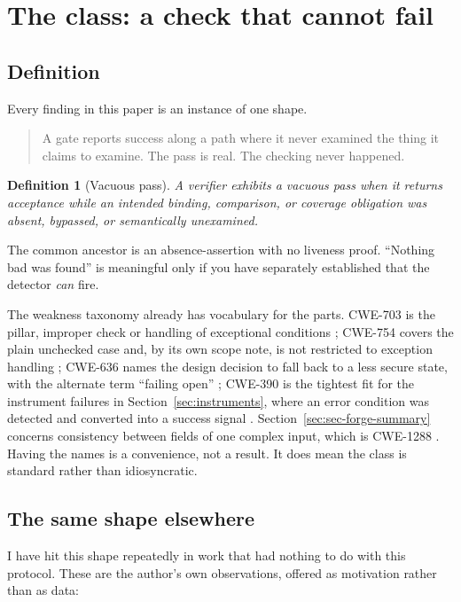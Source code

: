 \documentclass[11pt]{article}
\newtheorem{definition}{Definition}
\begin{document}
\section{The class: a check that cannot fail}
\label{sec:class}

\subsection{Definition}

Every finding in this paper is an instance of one shape.

\begin{quote}
A gate reports success along a path where it never examined the thing it claims to examine.
The pass is real. The checking never happened.
\end{quote}

\begin{definition}[Vacuous pass]
A verifier exhibits a \emph{vacuous pass} when it returns acceptance while an intended
binding, comparison, or coverage obligation was absent, bypassed, or semantically
unexamined.
\end{definition}

The common ancestor is an absence-assertion with no liveness proof. ``Nothing bad was
found'' is meaningful only if you have separately established that the detector \emph{can}
fire.

The weakness taxonomy already has vocabulary for the parts. CWE-703 is the pillar,
improper check or handling of exceptional conditions \citep{cwe703}; CWE-754 covers the
plain unchecked case and, by its own scope note, is not restricted to exception handling
\citep{cwe754}; CWE-636 names the design decision to fall back to a less secure state, with
the alternate term ``failing open'' \citep{cwe636}; CWE-390 is the tightest fit for the
instrument failures in Section~\ref{sec:instruments}, where an error condition was detected
and converted into a success signal \citep{cwe390}. Section~\ref{sec:sec-forge-summary}
concerns consistency between fields of one complex input, which is CWE-1288
\citep{cwe1288}. Having the names is a convenience, not a result. It does mean the class is
standard rather than idiosyncratic.

\subsection{The same shape elsewhere}

I have hit this shape repeatedly in work that had nothing to do with this protocol. These
are the author's own observations, offered as motivation rather than as data:
\end{document}
